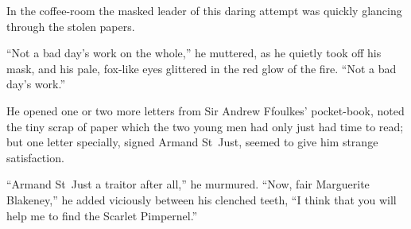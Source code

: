 In the coffee-room the masked leader of this daring attempt was quickly glancing through the stolen papers.

\enquote{Not a bad day's work on the whole,} he muttered, as he quietly took off his mask, and his pale, fox-like eyes glittered in the red glow of the fire. \enquote{Not a bad day's work.}

He opened one or two more letters from Sir Andrew Ffoulkes’ pocket-book, noted the tiny scrap of paper which the two young men had only just had time to read; but one letter specially, signed Armand St~Just, seemed to give him strange satisfaction.

\enquote{Armand St~Just a traitor after all,} he murmured. \enquote{Now, fair Marguerite Blakeney,} he added viciously between his clenched teeth, \enquote{I think that you will help me to find the Scarlet Pimpernel.}
